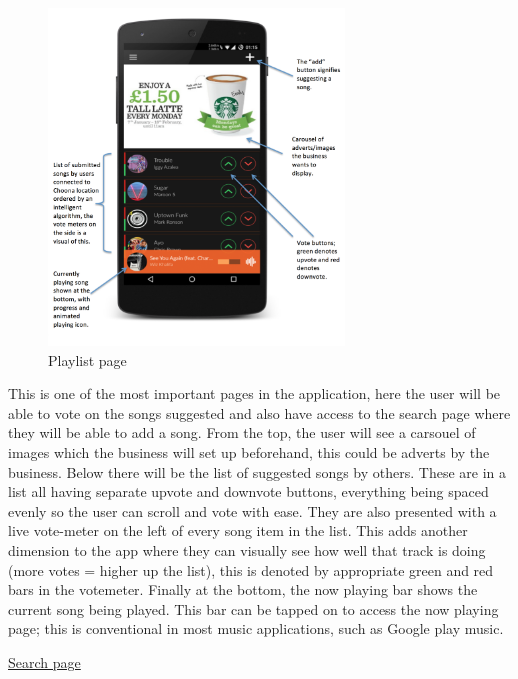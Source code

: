 \noindent
\begin{figure}[h!]
\centering
\includegraphics[width=0.7\textwidth]{./img/playlistannotated.png}
\caption{Playlist page}
\label{fig:playlist}
\end{figure}

This is one of the most important pages in the application, here the user will be able to vote on the songs suggested and also have access to the search page where they will be able to add a song. From the top, the user will see a carsouel of images which the business will set up beforehand, this could be adverts by the business. Below there will be the list of suggested songs by others. These are in a list all having separate upvote and downvote buttons, everything being spaced evenly so the user can scroll and vote with ease. They are also presented with a live vote-meter on the left of every song item in the list. This adds another dimension to the app where they can visually see how well that track is doing (more votes = higher up the list), this is denoted by appropriate green and red bars in the votemeter. Finally at the bottom, the now playing bar shows the current song being played. This bar can be tapped on to access the now playing page; this is conventional in most music applications, such as Google play music.

\newpage


\noindent\underline{Search page}\newline

